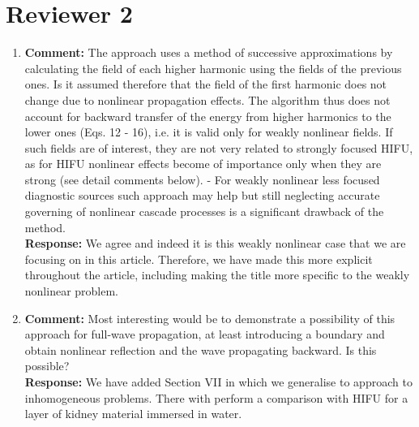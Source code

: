 \documentclass[11pt]{article}
\begin{document}
\section*{Reviewer 2}
\begin{enumerate}
	\item \textbf{Comment:} The approach uses a method of successive approximations by 
	calculating the field of each higher harmonic using the fields of the previous ones. Is it assumed therefore that the field 
	of the first harmonic does not change due to nonlinear propagation effects. The algorithm thus does not account for backward transfer of the energy from higher harmonics to the lower ones (Eqs. 12 - 16), i.e. it is valid only for weakly nonlinear fields.
	If such fields are of interest, they are not very related to strongly focused HIFU, as for HIFU nonlinear effects become of importance only when they are strong (see detail comments below).
-       For weakly nonlinear less focused diagnostic sources such approach may help but still neglecting accurate governing of nonlinear cascade processes is a significant drawback of the method.\\
	\textbf{Response:} We agree and indeed it is this weakly nonlinear case that we are focusing on
	in this article. Therefore, we have made this more explicit throughout the article, including 
	making the title more specific to the weakly nonlinear problem.
	
	\item \textbf{Comment:} Most interesting would be to demonstrate a possibility of this approach for full-wave propagation, at least introducing a boundary and obtain nonlinear reflection and the wave propagating backward. Is this possible? \\
	\textbf{Response:} We have added Section VII in which we generalise to approach to 
	inhomogeneous problems. There with perform a comparison with HIFU for a layer of kidney material immersed in water.
	

\end{enumerate}
\end{document}
